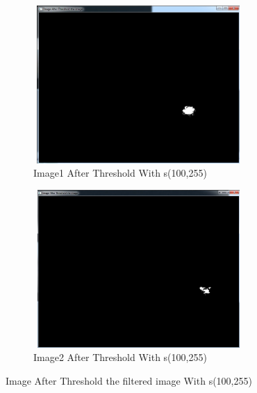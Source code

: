 \begin{figure}[!h]
\centering
\begin{subfigure}{.5\textwidth}
  \centering
  \includegraphics[width=8cm,height=6cm]{img/detectthreshold}
  \caption{Image1 After Threshold With s(100,255)}
  \label{fig:sub1}
\end{subfigure}%
\begin{subfigure}{.5\textwidth}
  \centering
  \includegraphics[width=8cm,height=6cm]{img/detectthreshold2}
  \caption{Image2 After Threshold With s(100,255)}
  \label{fig:sub2}
\end{subfigure}
\caption{Image After Threshold the filtered image With s(100,255)}
\label{fig:test}
\end{figure}

